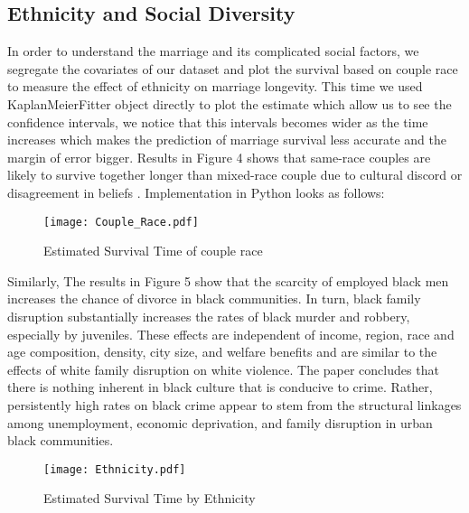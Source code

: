 \documentclass[10pt,twocolumn]{article}
\begin{document}
\subsection{Ethnicity and Social Diversity}
In order to understand the marriage and its complicated social factors, we segregate the covariates of our dataset and plot the survival based on couple race to measure the effect of ethnicity on marriage longevity. This time we used KaplanMeierFitter object directly to plot the estimate which allow us to see the confidence intervals, we notice that this intervals becomes wider as the time increases which makes the prediction of marriage survival less accurate and the margin of error bigger. Results in Figure 4 shows that same-race couples are likely to survive together longer than mixed-race couple due to cultural discord or disagreement in beliefs \cite{falicov1998cultural}.
Implementation in Python looks as follows:

\begin{figure}[!htb]
\centering
\texttt{[image: Couple\_Race.pdf]}
\caption{Estimated Survival Time of couple race}
\label{Fig:Survival_Time_Couple_Race}
\end{figure}
Similarly, The results in Figure 5 show that the scarcity of employed black men increases the chance of divorce in black communities. In turn, black family disruption substantially increases the rates of black murder and robbery, especially by juveniles. These effects are independent of income, region, race and age composition, density, city size, and welfare benefits and are similar to the effects of white family disruption on white violence. The paper concludes that there is nothing inherent in black culture that is conducive to crime. Rather, persistently high rates on black crime appear to stem from the structural linkages among unemployment, economic deprivation, and family disruption in urban black communities\cite{sampson1987urban}.
\begin{figure}[!htb]
\centering
\texttt{[image: Ethnicity.pdf]}
\caption{Estimated Survival Time by Ethnicity}
\label{Fig:Survival_Time_Ethnicity}
\end{figure}
\end{document}
